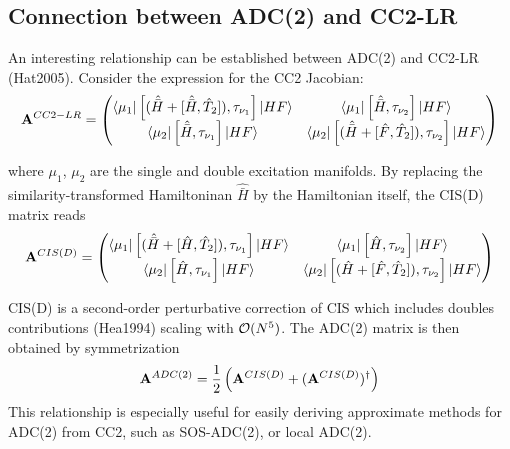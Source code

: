 
\subsection{Connection between ADC(2) and CC2-LR} 

An interesting relationship can be established between ADC(2) and CC2-LR (Hat2005). Consider the expression for the CC2 Jacobian:
\begin{equation}
\mathbf{A}^{CC2-LR} = \left( \begin{matrix}
\bra{\smash{\mu_1}} \left[ (\hat{\bar{H}} + \left[ \smash{ \hat{\bar{H}},\hat{T}_2} \right]), \tau_{\nu_1} \right] \ket{\smash{HF}} &  \bra{\smash{\mu_1}} \left[ \hat{\bar{H}}, \tau_{\nu_2} \right] \ket{\smash{HF}} \\
\bra{\smash{\mu_2}} \left[ \hat{\bar{H}}, \tau_{\nu_1} \right] \ket{\smash{HF}} & \bra{\smash{\mu_2}} \left[ (\hat{\bar{H}} + \left[ \smash{ \hat{F},\hat{T}_2} \right]), \tau_{\nu_2} \right] \ket{\smash{HF}}
\end{matrix}
\right)
\end{equation}

\noindent where $\mu_1$, $\mu_2$ are the single and double excitation manifolds. By replacing the similarity-transformed Hamiltoninan $\hat{\bar{H}}$ by the Hamiltonian itself, the CIS(D) matrix reads
\begin{equation}
\mathbf{A}^{CIS(D)} = \left( \begin{matrix}
\bra{\smash{\mu_1}} \left[ (\hat{\bar{H}} + \left[ \smash{ \hat{H},\hat{T}_2} \right]), \tau_{\nu_1} \right] \ket{\smash{HF}} &  \bra{\smash{\mu_1}} \left[ \hat{H}, \tau_{\nu_2} \right] \ket{\smash{HF}} \\
\bra{\smash{\mu_2}} \left[ \hat{H}, \tau_{\nu_1} \right] \ket{\smash{HF}} & \bra{\smash{\mu_2}} \left[ (\hat{H} + \left[ \smash{ \hat{F},\hat{T}_2} \right]), \tau_{\nu_2} \right] \ket{\smash{HF}}
\end{matrix}
\right)
\end{equation}

\noindent CIS(D) is a second-order perturbative correction of CIS which includes doubles contributions (Hea1994) scaling with $\mathcal{O}(N^{5})$. The ADC(2) matrix is then obtained by symmetrization
\begin{equation}
\mathbf{A}^{ADC(2)} = \frac{1}{2} \left(\mathbf{A}^{CIS(D)} + (\mathbf{A}^{CIS(D)})^{\dagger} \right)
\end{equation}
\noindent This relationship is especially useful for easily deriving approximate methods for ADC(2) from CC2, such as SOS-ADC(2), or local ADC(2).


